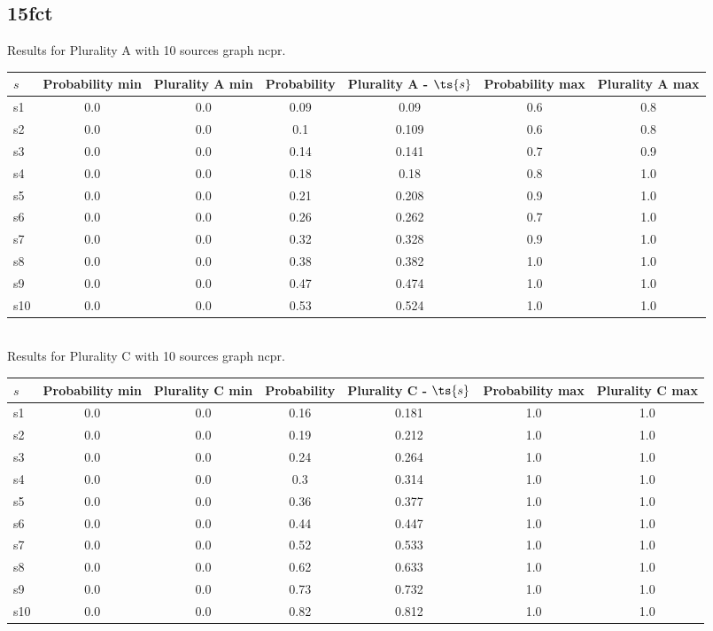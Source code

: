 \documentclass{article}
\begin{document}
\newpage

\subsection{15fct}

\noindent Results for Plurality A with 10 sources graph ncpr.

\noindent\begin{tabular}{|l|c|c|c|c|c|c|}
\hline
$s$& Probability min & Plurality A min & Probability & Plurality A - $\ts{s}$ & Probability max & Plurality A max\\
\hline
s1 &0.0 & 0.0 & 0.09 & 0.09 & 0.6 & 0.8\\
\hline
s2 &0.0 & 0.0 & 0.1 & 0.109 & 0.6 & 0.8\\
\hline
s3 &0.0 & 0.0 & 0.14 & 0.141 & 0.7 & 0.9\\
\hline
s4 &0.0 & 0.0 & 0.18 & 0.18 & 0.8 & 1.0\\
\hline
s5 &0.0 & 0.0 & 0.21 & 0.208 & 0.9 & 1.0\\
\hline
s6 &0.0 & 0.0 & 0.26 & 0.262 & 0.7 & 1.0\\
\hline
s7 &0.0 & 0.0 & 0.32 & 0.328 & 0.9 & 1.0\\
\hline
s8 &0.0 & 0.0 & 0.38 & 0.382 & 1.0 & 1.0\\
\hline
s9 &0.0 & 0.0 & 0.47 & 0.474 & 1.0 & 1.0\\
\hline
s10 &0.0 & 0.0 & 0.53 & 0.524 & 1.0 & 1.0\\
\hline
\end{tabular}\\

\noindent Results for Plurality C with 10 sources graph ncpr.

\noindent\begin{tabular}{|l|c|c|c|c|c|c|}
\hline
$s$& Probability min & Plurality C min & Probability & Plurality C - $\ts{s}$ & Probability max & Plurality C max\\
\hline
s1 &0.0 & 0.0 & 0.16 & 0.181 & 1.0 & 1.0\\
\hline
s2 &0.0 & 0.0 & 0.19 & 0.212 & 1.0 & 1.0\\
\hline
s3 &0.0 & 0.0 & 0.24 & 0.264 & 1.0 & 1.0\\
\hline
s4 &0.0 & 0.0 & 0.3 & 0.314 & 1.0 & 1.0\\
\hline
s5 &0.0 & 0.0 & 0.36 & 0.377 & 1.0 & 1.0\\
\hline
s6 &0.0 & 0.0 & 0.44 & 0.447 & 1.0 & 1.0\\
\hline
s7 &0.0 & 0.0 & 0.52 & 0.533 & 1.0 & 1.0\\
\hline
s8 &0.0 & 0.0 & 0.62 & 0.633 & 1.0 & 1.0\\
\hline
s9 &0.0 & 0.0 & 0.73 & 0.732 & 1.0 & 1.0\\
\hline
s10 &0.0 & 0.0 & 0.82 & 0.812 & 1.0 & 1.0\\
\hline
\end{tabular}\\
\end{document}
